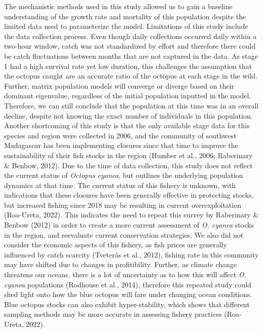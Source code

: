 \documentclass[
  12pt,
]{article}
\begin{document}
The mechanistic methods used in this study allowed us to gain a baseline understanding of the growth rate and mortality of this population despite the limited data used to parameterize the model. Limitations of this study include the data collection process. Even though daily collections occurred daily within a two-hour window, catch was not standardized by effort and therefore there could be catch fluctuations between months that are not captured in the data. As stage 1 had a high survival rate yet low duration, this challenges the assumption that the octopus caught are an accurate ratio of the octopus at each stage in the wild. Further, matrix population models will converge or diverge based on their dominant eigenvalue, regardless of the initial population inputted in the model. Therefore, we can still conclude that the population at this time was in an overall decline, despite not knowing the exact number of individuals in this population. Another shortcoming of this study is that the only available stage data for this species and region were collected in 2006, and the community of southwest Madagascar has been implementing closures since that time to improve the sustainability of their fish stocks in the region (Humber et al., 2006; Raberinary \& Benbow, 2012). Due to the time of data collection, this study does not reflect the current status of \emph{Octopus cyanea}, but outlines the underlying population dynamics at that time. The current status of this fishery is unknown, with indications that these closures have been generally effective in protecting stocks, but increased fishing since 2018 may be resulting in current overexploitation (Roa-Ureta, 2022). This indicates the need to repeat this survey by Raberinary \& Benbow (2012) in order to create a more current assessment of \emph{O. cyanea} stocks in the region, and reevaluate current conservation strategies. We also did not consider the economic aspects of this fishery, as fish prices are generally influenced by catch scarcity (Tveterås et al., 2012), fishing rate in this community may have shifted due to changes in profitibility. Further, as climate change threatens our oceans, there is a lot of uncertainty as to how this will affect \emph{O. cyanea} populations (Rodhouse et al., 2014), therefore this repeated study could shed light onto how the blue octopus will fare under changing ocean conditions. Blue octopus stocks can also exhibit hyper-stability, which shows that different sampling methods may be more accurate in assessing fishery practices (Roa-Ureta, 2022).
\end{document}

